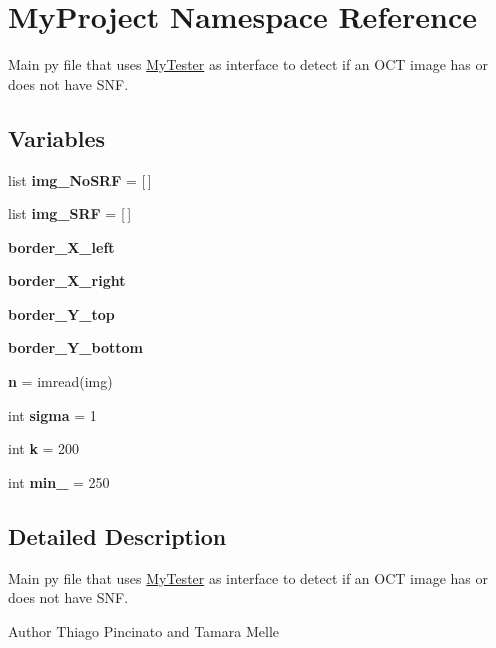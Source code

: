 \hypertarget{namespaceMyProject}{}\section{My\+Project Namespace Reference}
\label{namespaceMyProject}


Main py file that uses \hyperlink{namespaceMyTester}{My\+Tester} as interface to detect if an O\+CT image has or does not have S\+NF.  


\subsection*{Variables}
\begin{DoxyCompactItemize}
\item 
\mbox{\label{namespaceMyProject_a421f600910947b19798e4d2105e2b274}} 
list {\bfseries img\+\_\+\+No\+S\+RF} = \mbox{[}$\,$\mbox{]}
\item 
\mbox{\label{namespaceMyProject_a8f8118ad82cc243ce1e3409c1d2e4715}} 
list {\bfseries img\+\_\+\+S\+RF} = \mbox{[}$\,$\mbox{]}
\item 
\mbox{\label{namespaceMyProject_a3a7efe86c92d924da0435c7a7d0c09b8}} 
{\bfseries border\+\_\+\+X\+\_\+left}
\item 
\mbox{\label{namespaceMyProject_ad3866324efca420f655881ac4f77acd1}} 
{\bfseries border\+\_\+\+X\+\_\+right}
\item 
\mbox{\label{namespaceMyProject_a105eeaad0b621b25efd4f5ec8a079cfe}} 
{\bfseries border\+\_\+\+Y\+\_\+top}
\item 
\mbox{\label{namespaceMyProject_acf91a696345d7d57c44bf88cd801e125}} 
{\bfseries border\+\_\+\+Y\+\_\+bottom}
\item 
\mbox{\label{namespaceMyProject_a69d8eda7a900fea2e14e22b12c64bad7}} 
{\bfseries n} = imread(img)
\item 
\mbox{\label{namespaceMyProject_abb8e435d5d4bb6218e848bb2d3971377}} 
int {\bfseries sigma} = 1
\item 
\mbox{\label{namespaceMyProject_a8a4e5ac52da341fb337098b87c1f0f17}} 
int {\bfseries k} = 200
\item 
\mbox{\label{namespaceMyProject_adf16a5a717891e16861b84759c0cdda7}} 
int {\bfseries min\+\_\+} = 250
\end{DoxyCompactItemize}


\subsection{Detailed Description}
Main py file that uses \hyperlink{namespaceMyTester}{My\+Tester} as interface to detect if an O\+CT image has or does not have S\+NF. 

\begin{DoxyAuthor}{Author}
Thiago Pincinato and Tamara Melle 
\end{DoxyAuthor}
